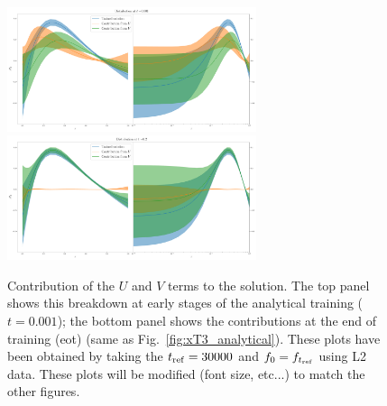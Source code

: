 

\begin{figure}[t!]
  \centering
  \includegraphics[width=0.65\textwidth]{plots/xT3_u_v_contribution_small_t.pdf}
  \\
  \includegraphics[width=0.65\textwidth]{plots/xT3_u_v_contribution_eot.pdf}
  \caption{Contribution of the $U$ and $V$ terms to the solution. The top panel
  shows this breakdown at early stages of the analytical training ($t=0.001$);
  the bottom panel shows the contributions at the end of training (eot) (same as
  Fig.~\ref{fig:xT3_analytical}). These plots have been obtained by taking the
  $t_{\rm ref} = 30000$ and $f_0 = f_{t_{\rm ref}}$ using L2 data. \ac{These
  plots will be modified (font size, etc...) to match the other figures.}}
\end{figure}

